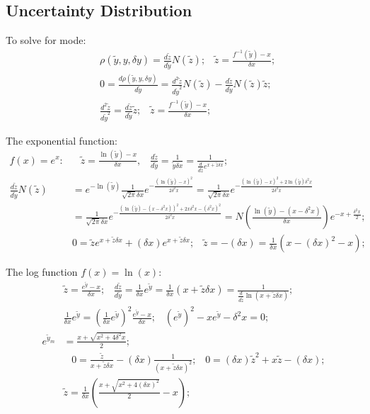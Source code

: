 \documentclass[twoside]{article}
\numberwithin{equation}{section}
\newcommand{\eqspace}{\;\;\;}
\begin{document}
\subsection{Uncertainty Distribution}

\iffalse

To solve for mode:
\begin{align*}
& \rho(\tilde{y}, y, \delta y) = \frac{d \tilde{z}}{d \tilde{y}} N(\tilde{z});
\eqspace \tilde{z} = \frac{f^{-1}(\tilde{y}) - x}{\delta x}; \\
& 0 = \frac{d \rho(\tilde{y}, y, \delta y)}{d \tilde{y}} = \frac{d^2 \tilde{z}}{d \tilde{y}^2} N(\tilde{z}) - \frac{d \tilde{z}}{d \tilde{y}} N(\tilde{z}) \tilde{z}; \\
& \frac{d^2 \tilde{z}}{d \tilde{y}^2} = \frac{d \tilde{z}}{d \tilde{y}} \tilde{z}; \eqspace \tilde{z} = \frac{f^{-1}(\tilde{y}) - x}{\delta x};
\end{align*}

The exponential function:
\begin{align*}
f(x) = e^x:& \eqspace 
\tilde{z} = \frac{\ln(\tilde{y}) - x}{\delta x}, \eqspace 
\frac{d \tilde{z}}{d \tilde{y}} = \frac{1}{\tilde{y} \delta x} = \frac{1}{\frac{d}{d \tilde{z}} e^{x + \tilde{z} \delta x}}; \eqspace \\
\frac{d \tilde{z}}{d \tilde{y}} N(\tilde{z})
&= e^{-\ln(\tilde{y})} \frac{1}{\sqrt{2\pi} \delta x} e^{-\frac{(\ln(\tilde{y}) - x)^2}{2 \delta^2 x}}
 = \frac{1}{\sqrt{2\pi} \delta x} e^{-\frac{(\ln(\tilde{y}) - x)^2 + 2 \ln(\tilde{y}) \delta^2 x }{2 \delta^2 x}} \\
& = \frac{1}{\sqrt{2\pi} \delta x} e^{-\frac{(\ln(\tilde{y}) - (x - \delta^2 x))^2 + 2 x \delta^2 x - (\delta^2 x)^2 }{2 \delta^2 x}}
 = N(\frac{\ln(\tilde{y}) - (x - \delta^2 x)}{\delta x}) e^{-x + \frac{\delta^2 x}{2}}; \\
& 0 = \tilde{z} e^{x + \tilde{z} \delta x} + (\delta x) e^{x + \tilde{z} \delta x}; \eqspace
 \tilde{z} = -(\delta x) = \frac{1}{\delta x}(x - (\delta x)^2 - x);
\end{align*}

The log function $f(x) = \ln(x)$:
\begin{align*}
& \tilde{z} = \frac{e^{\tilde{y}} - x}{\delta x}; \eqspace 
\frac{d \tilde{z}}{d \tilde{y}} = \frac{1}{\delta x} e^{\tilde{y}} = \frac{1}{\delta x} (x + \tilde{z} \delta x)
 = \frac{1}{\frac{d}{d \tilde{z}} \ln(x + \tilde{z} \delta x)}; \\
& \frac{1}{\delta x} e^{\tilde{y}} = (\frac{1}{\delta x} e^{\tilde{y}})^2 \frac{e^{\tilde{y}} - x}{\delta x}; \eqspace 
(e^{\tilde{y}})^2 - x e^{\tilde{y}} - \delta^2 x = 0; \\
e^{\tilde{y}_m} &= \frac{x + \sqrt{x^2 + 4 \delta^2 x}}{2}; \\
& \eqspace 0 = \frac{\tilde{z}}{x + \tilde{z} \delta x} - (\delta x) \frac{1}{(x + \tilde{z} \delta x)^2}; \eqspace
0 = (\delta x) \tilde{z}^2 + x \tilde{z} - (\delta x); \\
& \tilde{z} = \frac{1}{\delta x}(\frac{x + \sqrt{x^2 + 4 (\delta x)^2}}{2} - x);
\end{align*}
\end{document}
